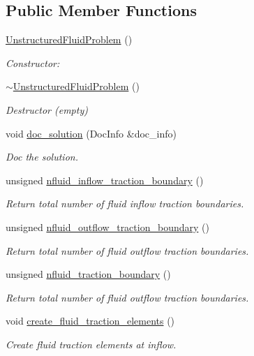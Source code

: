 \subsection*{Public Member Functions}
\begin{DoxyCompactItemize}
\item 
\hyperlink{classUnstructuredFluidProblem_a9751f4afac540e148b3d90ae43dd5187}{Unstructured\+Fluid\+Problem} ()
\begin{DoxyCompactList}\small\item\em Constructor\+: \end{DoxyCompactList}\item 
\hyperlink{classUnstructuredFluidProblem_a4d660faa6bae35197a4ea73139ac9963}{$\sim$\+Unstructured\+Fluid\+Problem} ()
\begin{DoxyCompactList}\small\item\em Destructor (empty) \end{DoxyCompactList}\item 
void \hyperlink{classUnstructuredFluidProblem_abcc9f0065665ae5239988b1a812e3f78}{doc\+\_\+solution} (Doc\+Info \&doc\+\_\+info)
\begin{DoxyCompactList}\small\item\em Doc the solution. \end{DoxyCompactList}\item 
unsigned \hyperlink{classUnstructuredFluidProblem_a8afc18327561107094fa94f2918a385f}{nfluid\+\_\+inflow\+\_\+traction\+\_\+boundary} ()
\begin{DoxyCompactList}\small\item\em Return total number of fluid inflow traction boundaries. \end{DoxyCompactList}\item 
unsigned \hyperlink{classUnstructuredFluidProblem_abcaa700f2e0e1b2097e7dc25fe087862}{nfluid\+\_\+outflow\+\_\+traction\+\_\+boundary} ()
\begin{DoxyCompactList}\small\item\em Return total number of fluid outflow traction boundaries. \end{DoxyCompactList}\item 
unsigned \hyperlink{classUnstructuredFluidProblem_ae04e768e915a5e097527cea22558203d}{nfluid\+\_\+traction\+\_\+boundary} ()
\begin{DoxyCompactList}\small\item\em Return total number of fluid outflow traction boundaries. \end{DoxyCompactList}\item 
void \hyperlink{classUnstructuredFluidProblem_ae95f1912572e8a5f0543eab9c0eb2634}{create\+\_\+fluid\+\_\+traction\+\_\+elements} ()
\begin{DoxyCompactList}\small\item\em Create fluid traction elements at inflow. \end{DoxyCompactList}\end{DoxyCompactItemize}
